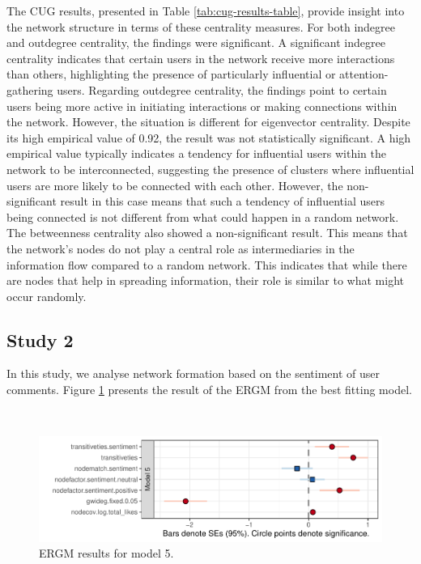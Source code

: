 \documentclass[
  man,floatsintext]{apa6}
\begin{document}
The CUG results, presented in Table \ref{tab:cug-results-table}, provide insight into the network structure in terms of these centrality measures.
For both indegree and outdegree centrality, the findings were significant. A significant indegree centrality indicates that certain users in the network receive more interactions than others, highlighting the presence of particularly influential or attention-gathering users. Regarding outdegree centrality, the findings point to certain users being more active in initiating interactions or making connections within the network.
However, the situation is different for eigenvector centrality. Despite its high empirical value of 0.92, the result was not statistically significant. A high empirical value typically indicates a tendency for influential users within the network to be interconnected, suggesting the presence of clusters where influential users are more likely to be connected with each other. However, the non-significant result in this case means that such a tendency of influential users being connected is not different from what could happen in a random network.
The betweenness centrality also showed a non-significant result. This means that the network's nodes do not play a central role as intermediaries in the information flow compared to a random network. This indicates that while there are nodes that help in spreading information, their role is similar to what might occur randomly.

\subsection{\texorpdfstring{Study 2\\
}{Study 2 }}\label{study-2}

In this study, we analyse network formation based on the sentiment of user comments. Figure \ref{fig:ergm-results-plot-model5} presents the result of the ERGM from the best fitting model.\\
\strut \\


\begin{figure}[H]
\includegraphics{SNA4DS_Report_files/figure-latex/ergm-results-plot-model5-1} \caption{ERGM results for model 5.}\label{fig:ergm-results-plot-model5}
\end{figure}
\end{document}

